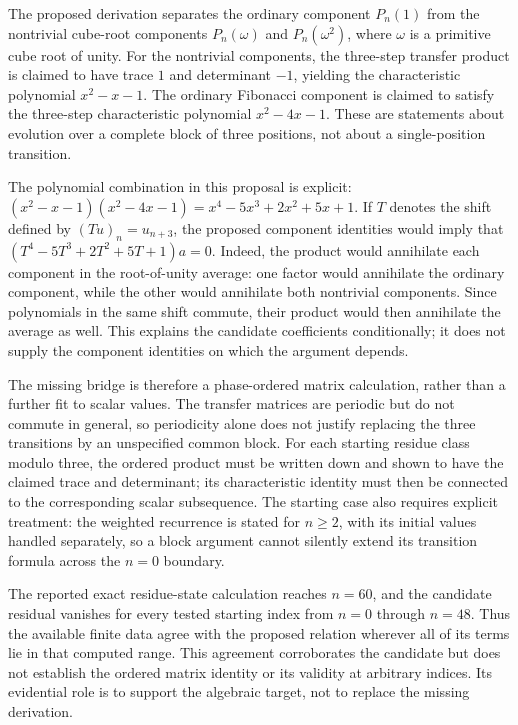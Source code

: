 \documentclass[11pt]{article}
\begin{document}
The proposed derivation separates the ordinary component $P_n(1)$ from the nontrivial cube-root components $P_n(\omega)$ and $P_n(\omega^2)$, where $\omega$ is a primitive cube root of unity. For the nontrivial components, the three-step transfer product is claimed to have trace $1$ and determinant $-1$, yielding the characteristic polynomial $x^2-x-1$. The ordinary Fibonacci component is claimed to satisfy the three-step characteristic polynomial $x^2-4x-1$. These are statements about evolution over a complete block of three positions, not about a single-position transition.

The polynomial combination in this proposal is explicit: $(x^2-x-1)(x^2-4x-1)=x^4-5x^3+2x^2+5x+1$. If $T$ denotes the shift defined by $(Tu)_n=u_{n+3}$, the proposed component identities would imply that $(T^4-5T^3+2T^2+5T+1)a=0$. Indeed, the product would annihilate each component in the root-of-unity average: one factor would annihilate the ordinary component, while the other would annihilate both nontrivial components. Since polynomials in the same shift commute, their product would then annihilate the average as well. This explains the candidate coefficients conditionally; it does not supply the component identities on which the argument depends.

The missing bridge is therefore a phase-ordered matrix calculation, rather than a further fit to scalar values. The transfer matrices are periodic but do not commute in general, so periodicity alone does not justify replacing the three transitions by an unspecified common block. For each starting residue class modulo three, the ordered product must be written down and shown to have the claimed trace and determinant; its characteristic identity must then be connected to the corresponding scalar subsequence. The starting case also requires explicit treatment: the weighted recurrence is stated for $n\geq2$, with its initial values handled separately, so a block argument cannot silently extend its transition formula across the $n=0$ boundary.

The reported exact residue-state calculation reaches $n=60$, and the candidate residual vanishes for every tested starting index from $n=0$ through $n=48$. Thus the available finite data agree with the proposed relation wherever all of its terms lie in that computed range. This agreement corroborates the candidate but does not establish the ordered matrix identity or its validity at arbitrary indices. Its evidential role is to support the algebraic target, not to replace the missing derivation.
\end{document}
